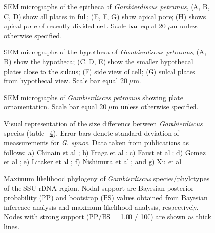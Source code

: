 \documentclass[12pt]{article}
\begin{document}
\FloatBarrier 
\begin{figure} 
\caption{SEM micrographs of the epitheca of \emph{Gambierdiscus petramus}, (A, B, C, D) show all plates in full; (E, F, G) show apical pore; (H) shows apical pore of recently divided cell. Scale bar equal 20 $\mu$m unless otherwise specified.} 
\label{fig:epiSEM}
\end{figure} 
\FloatBarrier 

\FloatBarrier 
\begin{figure} 
\caption{SEM micrographs of the hypotheca of \emph{Gambierdiscus petramus}, (A, B) show the hypotheca; (C, D, E) show the smaller hypothecal plates close to the sulcus; (F) side view of cell; (G) sulcal plates from hypothecal view. Scale bar equal 20 $\mu$m.} 
\label{fig:hypoSEM}
\end{figure} 
\FloatBarrier

\FloatBarrier 
\begin{figure} 
\caption{SEM micrographs of \emph{Gambierdiscus petramus} showing plate ornamentation. Scale bar equal 20 $\mu$m unless otherwise specified.} 
\label{fig:ornSEM}
\end{figure} 
\FloatBarrier

\FloatBarrier 
\begin{figure} 
\caption{Visual representation of the size difference between \emph{Gambierdiscus} species (table ~\ref{fig:SizeGraph}). Error bars denote standard deviation of meassurements for \emph{G. spnov}. Data taken from publications as follows: a) Chinain et al \citep{chinain1999morphology}; b) Fraga et al \citep{fraga2014genus}; c) Faust et al \citep{faust1995observation}; d) Gomez et al \citep{gomez2015fukuyoa}; e) Litaker et al \citep{litaker2009taxonomy}; f) Nishimura et al \citep{nishimura2014morphology}; and g) Xu et al \citep{xu2014distribution}} 
\label{fig:SizeGraph}
\end{figure} 


\FloatBarrier 
\begin{figure} 
\caption{Maximum likelihood phylogeny of \textit{Gambierdiscus} species/phylotypes of the SSU rDNA region. Nodal support are Bayesian posterior probability (PP) and bootstrap (BS) values obtained from Bayesian inference analysis and maximum likelihood analysis, respectively. Nodes with strong support (PP/BS = 1.00 / 100) are shown as thick lines.}
\label{fig:HGSSU} 
\end{figure} 
\FloatBarrier 
\end{document}
